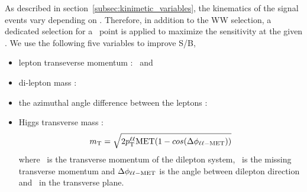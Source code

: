 As described in section~\ref{subsec:kinimetic_variables}, the kinematics of 
the signal events vary depending on \mHi. Therefore, 
in addition to the WW selection, a dedicated selection 
for a \mHi\ point is applied to maximize the sensitivity at the given \mHi. 
We use the following five variables to improve S/B, 
\begin{itemize}
\item lepton transeverse momentum : \ptlmax\ and \ptlmin
\item di-lepton mass : \mll 
\item the azimuthal angle difference between the leptons : \delphill
\item Higgs transverse mass : 
\begin{eqnarray} 
m_{\mathrm{T}} = \sqrt{2p_\mathrm{T}^{\ell\ell}\mathrm{MET}(1-cos(\Delta\phi_{\ell\ell-\mathrm{MET}}))}
\end{eqnarray} 
where \ptll\ is the transverse momentum of the dilepton system,
\met\ is the missing transverse momentum and
$\Delta\phi_{\ell\ell-\mathrm{MET}}$ is the angle between dilepton
direction and \met\ in the transverse plane.
\end{itemize}

